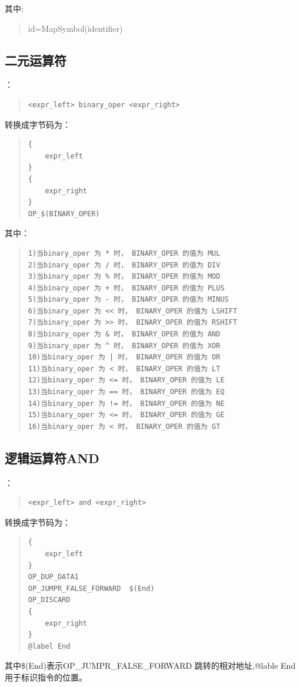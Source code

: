 其中:
\begin{quote}
id=MapSymbol(identifier)
\end{quote}



\subsection{二元运算符}
：
\begin{quote}
\begin{verbatim}
<expr_left> binary_oper <expr_right>
\end{verbatim}
\end{quote}
转换成字节码为：
\begin{quote}
\begin{verbatim}
{
    expr_left
}
{
    expr_right
}
OP_$(BINARY_OPER)

\end{verbatim}
\end{quote}
其中：
\begin{quote}
\begin{verbatim}
1)当binary_oper 为 * 时， BINARY_OPER 的值为 MUL
2)当binary_oper 为 / 时， BINARY_OPER 的值为 DIV 
3)当binary_oper 为 % 时， BINARY_OPER 的值为 MOD 
4)当binary_oper 为 + 时， BINARY_OPER 的值为 PLUS 
5)当binary_oper 为 - 时， BINARY_OPER 的值为 MINUS
6)当binary_oper 为 << 时， BINARY_OPER 的值为 LSHIFT
7)当binary_oper 为 >> 时， BINARY_OPER 的值为 RSHIFT
8)当binary_oper 为 & 时， BINARY_OPER 的值为 AND
9)当binary_oper 为 ^ 时， BINARY_OPER 的值为 XOR
10)当binary_oper 为 | 时， BINARY_OPER 的值为 OR
11)当binary_oper 为 < 时， BINARY_OPER 的值为 LT
12)当binary_oper 为 <= 时， BINARY_OPER 的值为 LE
13)当binary_oper 为 == 时， BINARY_OPER 的值为 EQ
14)当binary_oper 为 != 时， BINARY_OPER 的值为 NE
15)当binary_oper 为 <= 时， BINARY_OPER 的值为 GE
16)当binary_oper 为 < 时， BINARY_OPER 的值为 GT
\end{verbatim}
\end{quote}

\subsection{逻辑运算符AND}
：
\begin{quote}
\begin{verbatim}
<expr_left> and <expr_right>
\end{verbatim}
\end{quote}
转换成字节码为：
\begin{quote}
\begin{verbatim}
{
    expr_left
}
OP_DUP_DATA1
OP_JUMPR_FALSE_FORWARD  $(End)
OP_DISCARD
{
    expr_right
}
@label End
\end{verbatim}
\end{quote}
其中\$(End)表示OP\_JUMPR\_FALSE\_FORWARD 跳转的相对地址,@lable End 用于标识指令的位置。

